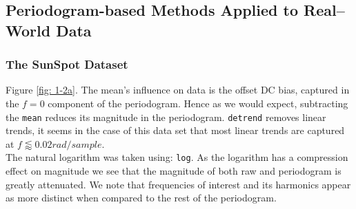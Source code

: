 \documentclass[12pt]{article}
\numberwithin{equation}{section}
\begin{document}
	
	\subsection{Periodogram-based Methods Applied to Real–World Data} \label{sec: 1-2-PSD-real-world}
	\subsubsection{The SunSpot Dataset}
	Figure \ref{fig: 1-2a}. The mean's influence on data is the offset DC bias, captured in the $f=0$ component of the periodogram. Hence as we would expect, subtracting the \texttt{mean} reduces its magnitude in the periodogram. \texttt{detrend} removes linear trends, it seems in the case of this data set that most linear trends are captured at $f \lessapprox 0.02 rad/sample$. \\
	
	The natural logarithm was taken using: \texttt{log}. As the logarithm has a compression effect on magnitude we see that the magnitude of both raw and periodogram is greatly attenuated. We note that frequencies of interest and its harmonics appear as more distinct when compared to the rest of the periodogram.
\end{document}
